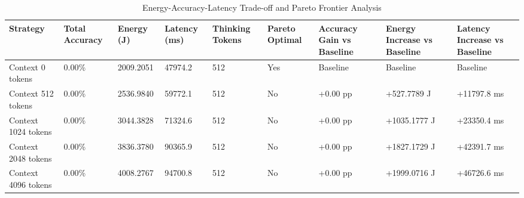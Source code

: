 \begin{table}
\caption{Energy-Accuracy-Latency Trade-off and Pareto Frontier Analysis}
\label{tab:tradeoff_comparison}
\begin{tabular}{lllllllll}
\toprule
Strategy & Total Accuracy & Energy (J) & Latency (ms) & Thinking Tokens & Pareto Optimal & Accuracy Gain vs Baseline & Energy Increase vs Baseline & Latency Increase vs Baseline \\
\midrule
Context 0 tokens & 0.00\% & 2009.2051 & 47974.2 & 512 & Yes & Baseline & Baseline & Baseline \\
Context 512 tokens & 0.00\% & 2536.9840 & 59772.1 & 512 & No & +0.00 pp & +527.7789 J & +11797.8 ms \\
Context 1024 tokens & 0.00\% & 3044.3828 & 71324.6 & 512 & No & +0.00 pp & +1035.1777 J & +23350.4 ms \\
Context 2048 tokens & 0.00\% & 3836.3780 & 90365.9 & 512 & No & +0.00 pp & +1827.1729 J & +42391.7 ms \\
Context 4096 tokens & 0.00\% & 4008.2767 & 94700.8 & 512 & No & +0.00 pp & +1999.0716 J & +46726.6 ms \\
\bottomrule
\end{tabular}
\end{table}
